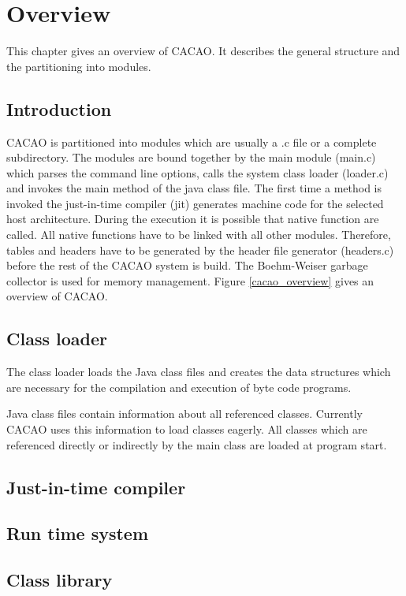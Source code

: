\chapter{Overview}

This chapter gives an overview of CACAO. It describes the general structure and
the partitioning into modules.


\section{Introduction}

CACAO is partitioned into modules which are usually a .c file or a complete
subdirectory. The modules are bound together by the main module (main.c) which
parses the command line options, calls the system class loader (loader.c) and invokes
the main method of the java class file. The first time a method is invoked
the just-in-time compiler (jit) generates machine code for the selected host architecture.
During the execution it is possible that native function are called. All native
functions have to be linked with all other modules. Therefore, tables
and headers have to be generated by the header file generator (headers.c) before
the rest of the CACAO system is build. The Boehm-Weiser garbage collector is
used for memory management. Figure \ref{cacao_overview} gives an overview of
CACAO.


\section{Class loader}

The class loader loads the Java class files and creates the data structures which
are necessary for the compilation and execution of byte code programs.

Java class files contain information about all referenced classes. Currently CACAO
uses this information to load classes eagerly. All classes which are referenced
directly or indirectly by the main class are loaded at program start. 

\section{Just-in-time compiler}

\section{Run time system}

\section{Class library}
